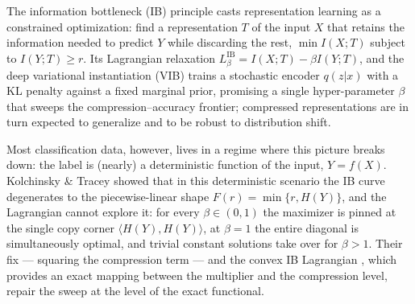 

The information bottleneck (IB) principle \cite{tishby2000information} casts
representation learning as a constrained optimization: find a representation $T$ of the
input $X$ that retains the information needed to predict $Y$ while discarding the rest,
$\min I(X;T)$ subject to $I(Y;T) \ge r$. Its Lagrangian relaxation
$L^{\mathrm{IB}}_\beta = I(X;T) - \beta I(Y;T)$, and the deep variational instantiation
(VIB) \cite{alemi2017deep} trains a stochastic encoder $q(z|x)$ with a KL penalty against
a fixed marginal prior, promising a single hyper-parameter $\beta$ that sweeps the
compression--accuracy frontier; compressed representations are in turn expected to
generalize and to be robust to distribution shift.

Most classification data, however, lives in a regime where this picture breaks down: the
label is (nearly) a deterministic function of the input, $Y = f(X)$. Kolchinsky \& Tracey
\cite{kolchinsky2019caveats} showed that in this deterministic scenario the IB curve
degenerates to the piecewise-linear shape $F(r) = \min\{r, H(Y)\}$, and the Lagrangian
cannot explore it: for every $\beta \in (0,1)$ the maximizer is pinned at the single copy
corner $\langle H(Y), H(Y)\rangle$, at $\beta = 1$ the entire diagonal is simultaneously
optimal, and trivial constant solutions take over for $\beta > 1$. Their fix --- squaring
the compression term --- and the convex IB Lagrangian
\cite{rodriguez2020convex}, which provides an exact mapping between the multiplier and the
compression level, repair the sweep at the level of the exact functional.

